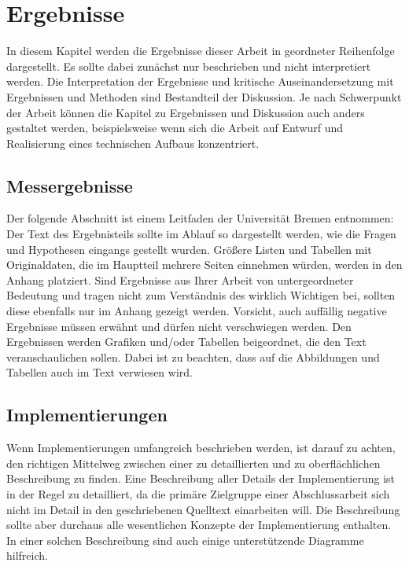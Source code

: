 
\chapter{Ergebnisse}
\label{chapter:ergebnisse}

In diesem Kapitel werden die Ergebnisse dieser Arbeit in geordneter Reihenfolge dargestellt. Es sollte dabei zunächst nur beschrieben und nicht interpretiert werden. Die Interpretation der Ergebnisse und kritische Auseinandersetzung mit Ergebnissen und Methoden sind Bestandteil der Diskussion.
Je nach Schwerpunkt der Arbeit können die Kapitel zu Ergebnissen und Diskussion auch anders gestaltet werden, beispielsweise wenn sich die Arbeit auf Entwurf und Realisierung eines technischen Aufbaus konzentriert. 

\section{Messergebnisse}

Der folgende Abschnitt ist einem Leitfaden der Universität Bremen \cite{uni-bremen} entnommen:
Der Text des Ergebnisteils sollte im Ablauf so dargestellt werden, wie die Fragen und Hypothesen eingangs gestellt wurden. Größere Listen und Tabellen mit Originaldaten, die im Hauptteil mehrere Seiten einnehmen würden, werden in den Anhang platziert. Sind Ergebnisse aus Ihrer Arbeit von untergeordneter Bedeutung und tragen nicht zum Verständnis des wirklich Wichtigen bei, sollten diese ebenfalls nur im Anhang gezeigt werden. Vorsicht, auch auffällig negative Ergebnisse müssen erwähnt und dürfen nicht verschwiegen werden.
Den Ergebnissen werden Grafiken und/oder Tabellen beigeordnet, die den Text veranschaulichen sollen. Dabei ist zu beachten, dass auf die Abbildungen und Tabellen auch im Text verwiesen wird.

\section{Implementierungen}

Wenn Implementierungen umfangreich beschrieben werden, ist darauf zu achten, den richtigen Mittelweg zwischen einer zu detaillierten und zu oberflächlichen Beschreibung zu finden. Eine Beschreibung aller Details der Implementierung ist in der Regel zu detailliert, da die primäre Zielgruppe einer Abschlussarbeit sich nicht im Detail in den geschriebenen Quelltext einarbeiten will. Die Beschreibung sollte aber durchaus alle wesentlichen Konzepte der Implementierung enthalten. In einer solchen Beschreibung sind auch einige unterstützende Diagramme hilfreich.

